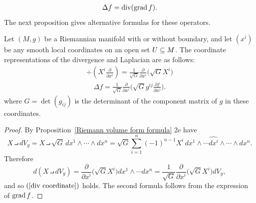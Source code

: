 \begin{align}\label{Laplacian def}
\Delta f=\mathrm{div}(\mathrm{grad}\, f).
\end{align}
The next proposition gives alternative formulas for these operators.
\begin{proposition}
Let $(M,g)$ be a Riemannian manifold with or without boundary, and let $(x^i)$ be any smooth local coordinates on an open set $U\subseteq M$. The coordinate representations of the divergence and Laplacian are as follows:
\begin{align}\label{div coordinate}
\div(X^i\frac{\partial}{\partial x^i})=\frac{1}{\sqrt{G}}\frac{\partial}{\partial x^i}\Big(\sqrt{G}X^i\Big)
\end{align}
\begin{align}\label{Laplacian coordinate}
\Delta f=\frac{1}{\sqrt{G}}\frac{\partial}{\partial x^i}\Big(\sqrt{G}g^{ij}\frac{\partial f}{\partial x^j}\Big).
\end{align}
where $G=\det(g_{ij})$ is the determinant of the component matrix of $g$ in these coordinates.
\end{proposition}
\begin{proof}
By Proposition~\ref{Riemann volume form formula} 2e have
\[X\intprod dV_g=X\intprod\sqrt{G}\, dx^1\wedge\cdots\wedge dx^n=\sqrt{G}\sum_{i=1}^{n}(-1)^{n-1}X^i\, dx^1\wedge\cdots\widehat{dx^i}\wedge\cdots\wedge dx^n.\]
Therefore
\[d(X\intprod dV_g)=\frac{\partial}{\partial x^i}\Big(\sqrt{G}X^i\Big)dx^1\wedge\cdots dx^n=\frac{1}{\sqrt{G}}\frac{\partial}{\partial x^i}\Big(\sqrt{G}X^i\Big)dV_g,\]
and so $(\ref{div coordinate})$ holds. The second formula follows from the expression of $\mathrm{grad}\, f$.
\end{proof}
